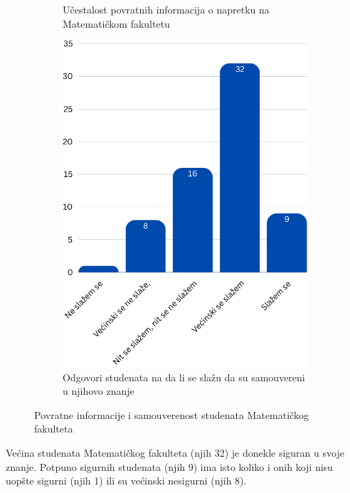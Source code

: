 \documentclass[a4paper]{article}
\begin{document}
\begin{figure}[h!]
\begin{center}
{\begin{subfigure}[b]{0.45\textwidth}
            \vspace{50pt}
            \caption{Učestalost povratnih informacija o napretku na Matematičkom fakultetu}
            \label{fig:povratne_informacije_matf}
        \end{subfigure}
    }
    \hfill
    \begin{subfigure}[b]{0.45\textwidth}
        \includegraphics[width=\textwidth]{Slike/SamouverenostStudenataMatf.png}
        \caption{Odgovori studenata na da li se slažu da su samouvereni u njihovo znanje}
        \label{fig:samouverenost_matf}
    \end{subfigure}
    \caption{Povratne informacije i samouverenost studenata Matematičkog fakulteta}
    \label{fig:combined_matf}
\end{center}
\end{figure}

Većina studenata Matematičkog fakulteta (njih 32) je donekle siguran u svoje znanje. Potpuno sigurnih studenata (njih 9) ima isto koliko i onih koji nisu uopšte sigurni (njih 1) ili su većinski nesigurni (njih 8).
\newpage
\end{document}
